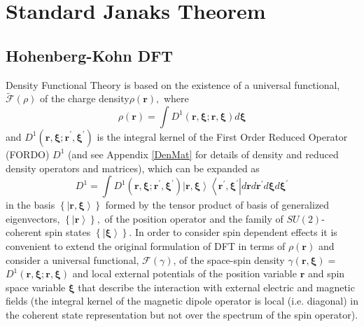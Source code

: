 \documentclass[aps,preprint]{revtex4}%
\begin{document}
\section{Standard Janaks Theorem\label{Standard}}

\subsection{Hohenberg-Kohn DFT}

Density Functional Theory is based on the existence of a universal functional,
$\mathcal{\tilde{F}}\left(  \rho\right)  $ \cite{HK} of the charge
density$\rho\left(  \mathbf{r}\right)  ,$ where
\begin{equation}
\rho\left(  \mathbf{r}\right)  =\int D^{1}\left(  \mathbf{r,\xi;r,\xi}\right)
d\mathbf{\xi}%
\end{equation}
and $D^{1}\left(  \mathbf{r,\xi;r}^{\prime}\mathbf{,\xi}^{\prime}\right)  $ is
the integral kernel of the First Order Reduced Operator (FORDO) $D^{1}$
\cite{Coleman} (and see Appendix \ref{DenMat} for details of density and
reduced density operators and matrices), which can be expanded as
\begin{equation}
D^{1}=\int D^{1}\left(  \mathbf{r,\xi;r}^{\prime}\mathbf{,\xi}^{\prime
}\right)  \left\vert \mathbf{r,\xi}\right\rangle \left\langle \mathbf{r}%
^{\prime}\mathbf{,\xi}^{\prime}\right\vert d\mathbf{r}d\mathbf{r}^{\prime
}d\mathbf{\xi}d\mathbf{\xi}^{\prime}%
\end{equation}
in the basis $\left\{  \left\vert \mathbf{r,\xi}\right\rangle \right\}  $
formed by the tensor product of basis of generalized eigenvectors, $\left\{
\left\vert \mathbf{r}\right\rangle \right\}  ,$ of the position operator and
the family of $SU(2)$-coherent spin states $\left\{  \left\vert \mathbf{\xi
}\right\rangle \right\}  $. In order to consider spin dependent effects it is
convenient to extend the original formulation of DFT in terms of $\rho\left(
\mathbf{r}\right)  $ and consider a universal functional, $\mathcal{F}\left(
\gamma\right)  $, of the space-spin density $\gamma\left(  \mathbf{r,\xi
}\right)  =$ $D^{1}\left(  \mathbf{r,\xi;r,\xi}\right)  $
\cite{weiner-trickey} and local external potentials of the position variable
$\mathbf{r}$ and spin space variable $\mathbf{\xi}$ that describe the
interaction with external electric and magnetic fields (the integral kernel of
the magnetic dipole operator is local (i.e. diagonal) in the coherent state
representation but not over the spectrum of the spin operator)$.$
\end{document}
